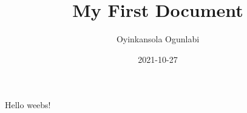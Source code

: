 \documentclass{article}
\title{My First Document}
\date{2021-10-27}
\author{Oyinkansola Ogunlabi}
\begin{document}
	\maketitle
	\newpage
	Hello weebs!
	
\end{document}
